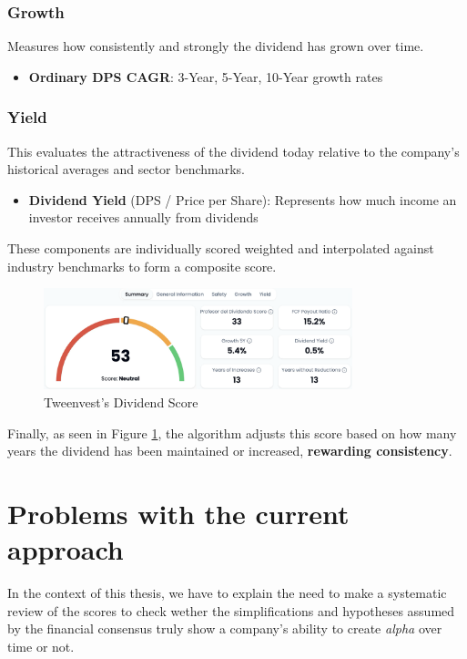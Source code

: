 \documentclass[11pt,english,a4paper,hidelinks]{book}
\begin{document}
\subsubsection{Growth}
\noindent Measures how consistently and strongly the dividend has grown over time.
\begin{itemize}
    \item \textbf{Ordinary DPS CAGR}: 3-Year, 5-Year, 10-Year growth rates
\end{itemize}

\subsubsection{Yield}
\noindent This evaluates the attractiveness of the dividend today relative to the company's historical averages and sector benchmarks.
\begin{itemize}
    \item \textbf{Dividend Yield} (DPS / Price per Share): Represents how much income an investor receives annually from dividends
\end{itemize}

\vspace{0.5cm}
\noindent These components are individually scored weighted and interpolated against industry benchmarks to form a composite score. 

\begin{figure}[H]
    \centering
    \includegraphics[width=0.8\textwidth]{images/tweenvest/dividend score.png}
    \caption{Tweenvest's Dividend Score}
    \label{fig:dividend_score}
\end{figure}

\noindent Finally, as seen in Figure \ref{fig:dividend_score}, the algorithm adjusts this score based on how many years the dividend has been maintained or increased, \textbf{rewarding consistency}.


\section{Problems with the current approach}

\noindent In the context of this thesis, we have to explain the need to make a systematic review of the scores to check wether the simplifications and hypotheses assumed by the financial consensus truly show a company's ability to create \textit{alpha} over time or not.
\end{document}
